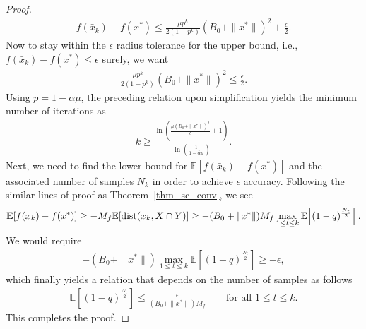 \documentclass{article}
\def\a{\alpha}
\def\dist{{\rm dist}}
\newcommand{\EXP}[1]
{\mathbb{E}\!\left[#1\right] }
\theoremstyle{plain}
\theoremstyle{definition}
\theoremstyle{remark}
\begin{document}
\begin{proof}
    \begin{align*}
        f(\bar x_{k})-f(x^*) \leq \frac{\mu p^k}{2 (1-p^k)} (B_0+\|x^*\|)^2 + \frac{\epsilon}{2} . 
    \end{align*}
    Now to stay within the $\epsilon$ radius tolerance for the upper bound, i.e., $f(\bar x_{k})-f(x^*) \leq \epsilon$ surely, we want
    \begin{align*}
        \frac{\mu p^k}{2 (1-p^k)} (B_0+\|x^*\|)^2 \leq \frac{\epsilon}{2}.
    \end{align*}
    Using $p = 1- \bar \a \mu$, the preceding relation upon simplification yields the minimum number of iterations as
    \begin{align*}
        k \geq \frac{\ln\left( \frac{\mu (B_0 + \|x^*\|)^2}{\epsilon} + 1 \right)}{\ln\left( \frac{1}{1- \bar \a \mu} \right)} .
    \end{align*}
    Next, we need to find the lower bound for $\EXP{f(\bar x_{k})-f(x^*)}$ and the associated number of samples $N_k$ in order to achieve $\epsilon$ accuracy. Following the similar lines of proof as Theorem~\ref{thm_sc_conv}, we see
    \begin{align*}
        \EXP{f(\bar x_{k})-f(x^*)} \geq -M_f \EXP{\dist(\bar x_{k}, X \cap Y)} \geq - (B_0 + \|x^*\|) M_f \max_{1 \leq t \leq k} \EXP{(1-q)^{\frac{N_t}{2}}} .
    \end{align*}
    We would require 
    \begin{align*}
        - (B_0 + \|x^*\|) \max_{1 \leq t \leq k} \EXP{(1-q)^{\frac{N_t}{2}}} \geq -\epsilon ,
    \end{align*}
    which finally yields a relation that depends on the number of samples as follows
    \begin{align*}
        \EXP{(1-q)^{\frac{N_t}{2}}} \leq \frac{\epsilon}{(B_0 + \|x^*\|) M_f} \qquad \text{for all $1 \leq t \leq k$.}
    \end{align*}
    This completes the proof.
\end{proof}
\end{document}
